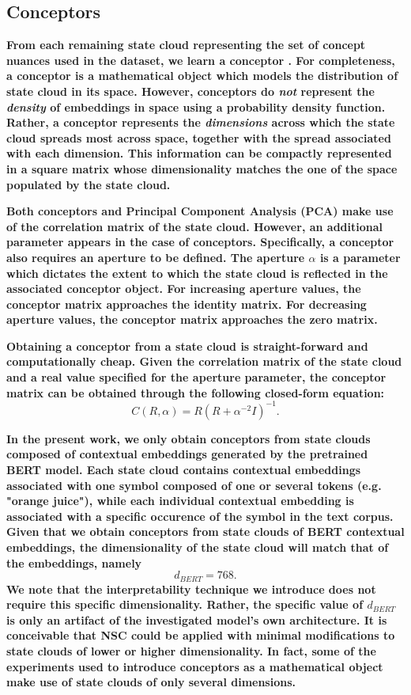 \subsection{Conceptors}

\textbf{From each remaining state cloud representing the set of concept nuances used in the dataset, we learn a conceptor \citep{jaeger_controlling_2017}. For completeness, a conceptor is a mathematical object which models the distribution of state cloud in its space. However, conceptors do \textit{not} represent the \textit{density} of embeddings in space using a probability density function. Rather, a conceptor represents the \textit{dimensions} across which the state cloud spreads most across space, together with the spread associated with each dimension. This information can be compactly represented in a square matrix whose dimensionality matches the one of the space populated by the state cloud.}

\textbf{Both conceptors and Principal Component Analysis (PCA) make use of the correlation matrix of the state cloud. However, an additional parameter appears in the case of conceptors. Specifically, a conceptor also requires an aperture to be defined. The aperture $\alpha$ is a parameter which dictates the extent to which the state cloud is reflected in the associated conceptor object. For increasing aperture values, the conceptor matrix approaches the identity matrix. For decreasing aperture values, the conceptor matrix approaches the zero matrix.}

\textbf{Obtaining a conceptor from a state cloud is straight-forward and computationally cheap. Given the correlation matrix of the state cloud and a real value specified for the aperture parameter, the conceptor matrix can be obtained through the following closed-form equation:$$C(R, \alpha) = R (R + \alpha^{-2} I)^{-1}.$$}

\textbf{In the present work, we only obtain conceptors from state clouds composed of contextual embeddings generated by the pretrained BERT model. Each state cloud contains contextual embeddings associated with one symbol composed of one or several tokens (e.g. "orange juice"), while each individual contextual embedding is associated with a specific occurence of the symbol in the text corpus. Given that we obtain conceptors from state clouds of BERT contextual embeddings, the dimensionality of the state cloud will match that of the embeddings, namely $$d_{BERT}=768.$$ We note that the interpretability technique we introduce does not require this specific dimensionality. Rather, the specific value of $d_{BERT}$ is only an artifact of the investigated model's own architecture. It is conceivable that NSC could be applied with minimal modifications to state clouds of lower or higher dimensionality. In fact, some of the experiments used to introduce conceptors as a mathematical object make use of state clouds of only several dimensions.}

